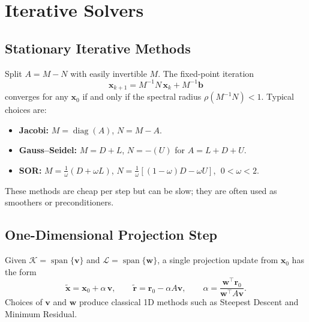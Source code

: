 \chapter{Iterative Solvers}
\label{chap:projection-methods}

\section{Stationary Iterative Methods}
Split $A=M-N$ with easily invertible $M$. The fixed-point iteration
\[
  \mathbf{x}_{k+1} = M^{-1}N\,\mathbf{x}_k + M^{-1}\mathbf{b}
\]
converges for any $\mathbf{x}_0$ if and only if the spectral radius $\rho(M^{-1}N)<1$.
Typical choices are:
\begin{itemize}
  \item \textbf{Jacobi:} $M=\operatorname{diag}(A)$, $N=M-A$.
  \item \textbf{Gauss--Seidel:} $M=D+L$, $N=-(U)$ for $A=L+D+U$.
  \item \textbf{SOR:} $M=\tfrac{1}{\omega}(D+\omega L)$, $N=\tfrac{1}{\omega}[(1-\omega)D-\omega U]$, $\;0<\omega<2$.
\end{itemize}
These methods are cheap per step but can be slow; they are often used as smoothers or preconditioners.

\section{One-Dimensional Projection Step}
Given $\mathcal{K}=\operatorname{span}\{\mathbf{v}\}$ and $\mathcal{L}=\operatorname{span}\{\mathbf{w}\}$, a single projection update from $\mathbf{x}_0$ has the form
\[
  \widetilde{\mathbf{x}} = \mathbf{x}_0 + \alpha\,\mathbf{v},\qquad \widetilde{\mathbf{r}}=\mathbf{r}_0-\alpha A\mathbf{v},\qquad \alpha=\frac{\mathbf{w}^\top\mathbf{r}_0}{\mathbf{w}^\top A\mathbf{v}}.
\]
Choices of $\mathbf{v}$ and $\mathbf{w}$ produce classical 1D methods such as Steepest Descent and Minimum Residual.

